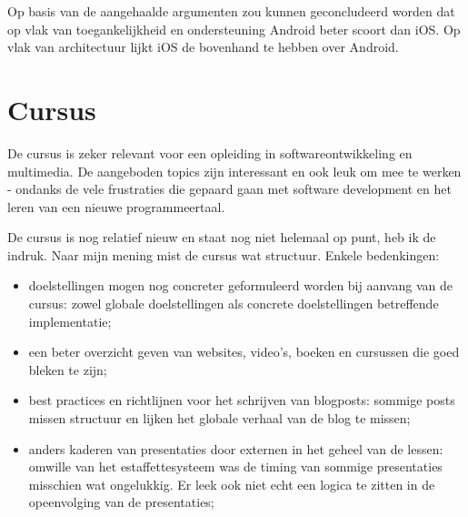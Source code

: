 Op basis van de aangehaalde argumenten zou kunnen geconcludeerd worden dat op vlak van toegankelijkheid en ondersteuning Android beter scoort dan iOS. Op vlak van architectuur lijkt iOS de bovenhand te hebben over Android.


\section{Cursus}

De cursus is zeker relevant voor een opleiding in softwareontwikkeling en multimedia. De aangeboden topics zijn interessant en ook leuk om mee te werken - ondanks de vele frustraties die gepaard gaan met software development en het leren van een nieuwe programmeertaal.

De cursus is nog relatief nieuw en staat nog niet helemaal op punt, heb ik de indruk. Naar mijn mening mist de cursus wat structuur. Enkele bedenkingen:

\begin{itemize}
	\item doelstellingen mogen nog concreter geformuleerd worden bij aanvang van de cursus: zowel globale doelstellingen als concrete doelstellingen betreffende implementatie;
	\item een beter overzicht geven van websites, video's, boeken en cursussen die goed bleken te zijn;
	\item best practices en richtlijnen voor het schrijven van blogposts: sommige posts missen structuur en lijken het globale verhaal van de blog te missen;
	\item anders kaderen van presentaties door externen in het geheel van de lessen: omwille van het estaffettesysteem was de timing van sommige presentaties misschien wat ongelukkig. Er leek ook niet echt een logica te zitten in de opeenvolging van de presentaties; %
\end{itemize}






